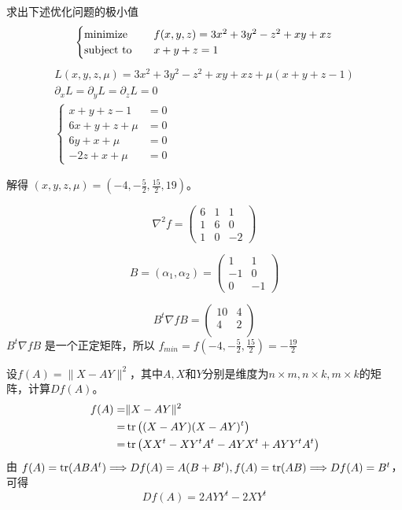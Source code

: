 \begin{problem}
	求出下述优化问题的极小值\[\begin{cases}
		\operatorname{minimize}\quad & f(x, y, z)=3 x^{2}+3 y^{2}-z^{2}+x y+x z \\
		\operatorname{subject\ to}\quad & x+y+z=1
	\end{cases}\]
	\solution \begin{gather*}
		L(x, y, z, \mu) = 3x^2 + 3y^2 - z^2 + xy + xz + \mu(x + y + z - 1)\\
		\partial_xL = \partial_yL = \partial_zL = 0\\
		\begin{cases}
			x + y + z - 1 &= 0\\
			6x + y + z + \mu &= 0\\
			6y + x + \mu &= 0\\
			-2z + x + \mu &= 0
		\end{cases}
	\end{gather*}
	
	解得 $(x, y, z, \mu) = (-4, -\frac{5}{2}, \frac{15}{2}, 19)$。

	$$\nabla^2 f = \begin{pmatrix}
		6 & 1 & 1 \\
		1 & 6 & 0 \\
		1 & 0 & -2
	\end{pmatrix}$$

	$$B = (\alpha_1, \alpha_2) = \begin{pmatrix}
		1 & 1 \\
		-1 & 0 \\ 
		0 & -1
	\end{pmatrix}$$

	$$B^t\nabla f B = \begin{pmatrix}
		 10 & 4 \\ 
		 4 & 2 \\
	\end{pmatrix}$$
	$B^t\nabla f B$ 是一个正定矩阵，所以 $f_{min} = f(-4, -\frac{5}{2}, \frac{15}{2}) =  -\frac{19}{2}$
\end{problem}

\begin{problem}
	设$f(A)=\|X-AY\|^2$，其中$A,X$和$Y$分别是维度为$n\times m,n\times k,m\times k$的矩阵，计算$Df(A)$。
	\solution \begin{align*}
		f(A) =& \|X - AY\|^2 \\
		=& \tr\left((X - AY)(X - AY)^t\right) \\
		=& \tr\left(XX^t - XY^tA^t - AYX^t + AYY^tA^t\right)
	\end{align*}
	由 $f(A) = \tr(ABA^t) \Longrightarrow Df(A) = A(B + B^t), f(A) = \tr(AB) \Longrightarrow Df(A) = B^t$，可得 \[Df(A) = 2AYY^t - 2XY^t\]
\end{problem}

